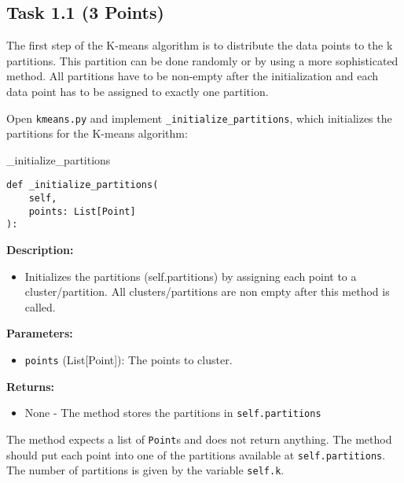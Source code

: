 \documentclass[
english,
smallborders
]{i6prcsht}
\newcommand{\points}[1]{\hfill \color{red}(#1 Points)\color{black}}
\begin{document}
\subsection*{Task 1.1 \points{3}}

The first step of the K-means algorithm is to distribute the data points to the k partitions. This partition can be done randomly or by using a more sophisticated method. All partitions have to be non-empty after the initialization and each data point has to be assigned to exactly one partition.

Open \texttt{kmeans.py} and implement \texttt{\_initialize\_partitions}, which initializes the partitions for the K-means algorithm:

\vspace*{0.3cm}

\begin{functionbox}{\_initialize\_partitions}
	\begin{lstlisting}[numbers=none]
def _initialize_partitions(
    self, 
    points: List[Point]
):
\end{lstlisting}
	
	\textbf{Description:}
	\begin{itemize}[leftmargin=*,topsep=0pt]
		\item Initializes the partitions (self.partitions) by assigning each point to a cluster/partition. All clusters/partitions are non empty after this method is called.
	\end{itemize}
	
	\textbf{Parameters:}
	\begin{itemize}[leftmargin=*,topsep=0pt]
		\item \texttt{points} (List[Point]): The points to cluster.
	\end{itemize}
	
	\textbf{Returns:}
	\begin{itemize}[leftmargin=*,topsep=0pt]
		\item None - The method stores the partitions in \texttt{self.partitions}
	\end{itemize}
\end{functionbox}

\vspace*{0.5cm}

The method expects a list of \texttt{Point}s and does not return anything. The method should put each point into one of the partitions available at \texttt{self.partitions}. The number of partitions is given by the variable \texttt{self.k}.
\end{document}
